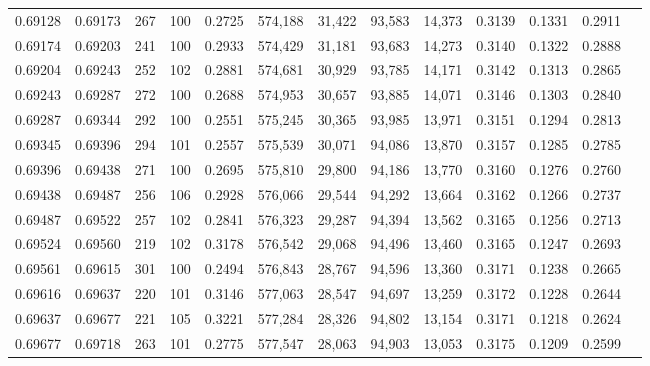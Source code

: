 \begin{tabular}{rrrrrrrrrrrrr}
0.69128 & 0.69173 &   267 & 100 &                                     0.2725 & 574,188 &  31,422 &  93,583 &  14,373 & 0.3139 & 0.1331 & 0.2911 \\
0.69174 & 0.69203 &   241 & 100 &                                     0.2933 & 574,429 &  31,181 &  93,683 &  14,273 & 0.3140 & 0.1322 & 0.2888 \\
0.69204 & 0.69243 &   252 & 102 &                                     0.2881 & 574,681 &  30,929 &  93,785 &  14,171 & 0.3142 & 0.1313 & 0.2865 \\
0.69243 & 0.69287 &   272 & 100 &                                     0.2688 & 574,953 &  30,657 &  93,885 &  14,071 & 0.3146 & 0.1303 & 0.2840 \\
0.69287 & 0.69344 &   292 & 100 &                                     0.2551 & 575,245 &  30,365 &  93,985 &  13,971 & 0.3151 & 0.1294 & 0.2813 \\
0.69345 & 0.69396 &   294 & 101 &                                     0.2557 & 575,539 &  30,071 &  94,086 &  13,870 & 0.3157 & 0.1285 & 0.2785 \\
0.69396 & 0.69438 &   271 & 100 &                                     0.2695 & 575,810 &  29,800 &  94,186 &  13,770 & 0.3160 & 0.1276 & 0.2760 \\
0.69438 & 0.69487 &   256 & 106 &                                     0.2928 & 576,066 &  29,544 &  94,292 &  13,664 & 0.3162 & 0.1266 & 0.2737 \\
0.69487 & 0.69522 &   257 & 102 &                                     0.2841 & 576,323 &  29,287 &  94,394 &  13,562 & 0.3165 & 0.1256 & 0.2713 \\
0.69524 & 0.69560 &   219 & 102 &                                     0.3178 & 576,542 &  29,068 &  94,496 &  13,460 & 0.3165 & 0.1247 & 0.2693 \\
0.69561 & 0.69615 &   301 & 100 &                                     0.2494 & 576,843 &  28,767 &  94,596 &  13,360 & 0.3171 & 0.1238 & 0.2665 \\
0.69616 & 0.69637 &   220 & 101 &                                     0.3146 & 577,063 &  28,547 &  94,697 &  13,259 & 0.3172 & 0.1228 & 0.2644 \\
0.69637 & 0.69677 &   221 & 105 &                                     0.3221 & 577,284 &  28,326 &  94,802 &  13,154 & 0.3171 & 0.1218 & 0.2624 \\
0.69677 & 0.69718 &   263 & 101 &                                     0.2775 & 577,547 &  28,063 &  94,903 &  13,053 & 0.3175 & 0.1209 & 0.2599 \\

\end{tabular}
